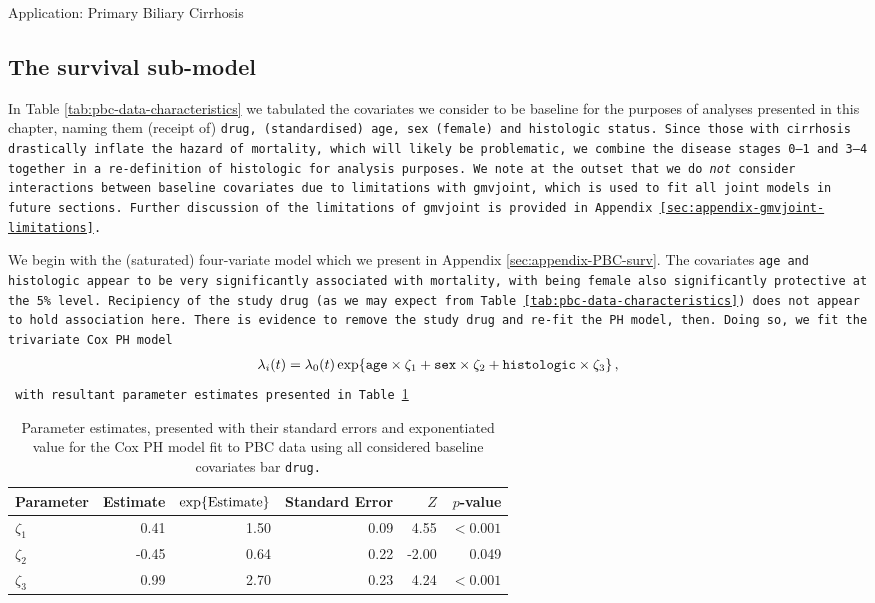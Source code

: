 \begin{chapter}{\label{cha:app-PBC}Application: Primary Biliary Cirrhosis}
  \subsection{The survival sub-model}\label{sec:pbc-modelbuilding-survival}
  In Table \ref{tab:pbc-data-characteristics} we tabulated the covariates we consider to be baseline for the purposes of analyses presented in this chapter, naming them (receipt of) \tt{drug}, (standardised) \tt{age}, \tt{sex} (female) and \tt{histologic} status. Since those with cirrhosis drastically inflate the hazard of mortality, which will likely be problematic, we combine the disease stages 0--1 and 3--4 together in a re-definition of \tt{histologic} for analysis purposes. We note at the outset that we do \textit{not} consider interactions between baseline covariates due to limitations with \tt{gmvjoint}, which is used to fit all joint models in future sections. Further discussion of the limitations of \tt{gmvjoint} is provided in Appendix \ref{sec:appendix-gmvjoint-limitations}.

  We begin with the (saturated) four-variate model which we present in Appendix \ref{sec:appendix-PBC-surv}. The covariates \tt{age} and \tt{histologic} appear to be very significantly associated with mortality, with being female also significantly protective at the 5\% level. Recipiency of the study drug (as we may expect from Table \ref{tab:pbc-data-characteristics}) does not appear to hold association here. There is evidence to remove the study drug and re-fit the PH model, then. Doing so, we fit the trivariate Cox PH model
  \begin{align}
      \lambda_i\!\left( t\right)=\lambda_0\!\left( t\right)\exp\!\left\{\texttt{age}\times\zeta_1+\texttt{sex}\times\zeta_2+\texttt{histologic}\times\zeta_3\right\},
  \label{eq:pbc-surv-model}
  \end{align}
  with resultant parameter estimates presented in Table \ref{tab:pbc-surv-model}
  \begin{table}[ht]
  \centering
  \captionsetup{font=scriptsize}
  \begin{tabular}{l|rrrrr}
    Parameter & Estimate & $\exp\!\left\{\mathrm{Estimate}\right\}$ & Standard Error & $Z$ & $p$-value \\ 
    \hline
    $\zeta_1$ & 0.41 & 1.50 & 0.09 & 4.55 & $<0.001$ \\ 
    $\zeta_2$ & -0.45 & 0.64 & 0.22 & -2.00 & 0.049   \\ 
    $\zeta_3$ & 0.99 & 2.70 & 0.23 & 4.24 & $<0.001$ \\ 
    \hline
  \end{tabular}
  \caption{Parameter estimates, presented with their standard errors and exponentiated value for the Cox PH model fit to PBC data using all considered baseline covariates bar \tt{drug}.}
  \label{tab:pbc-surv-model}
  \end{table}
  

\end{chapter}
